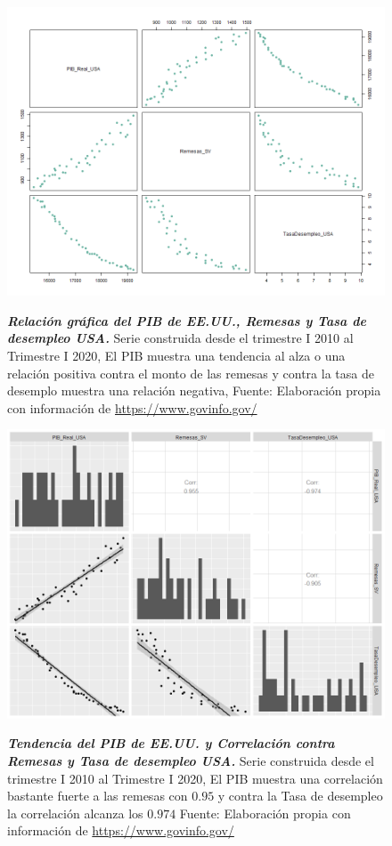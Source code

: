 \begin{figure}[H]
	\centering
	\resizebox{12 cm}{!} { 
		\includegraphics[width=1\linewidth]{Imagenes/Grafo_09}}
	\caption{\textbf{\textit{Relación gráfica del PIB de EE.UU., Remesas y Tasa de desempleo USA.}}
		{\small Serie construida desde el trimestre I 2010 al Trimestre I 2020, El PIB muestra una tendencia al alza o una relación positiva contra el monto de las remesas y contra la tasa de desemplo muestra una relación negativa, Fuente: Elaboración propia con información de \href{https://www.govinfo.gov/}{https://www.govinfo.gov/}}
	} 
	\label{fig:9}
	
\end{figure}


\begin{figure}[H]
	\centering
	\resizebox{12 cm}{!} { 
		\includegraphics[width=1\linewidth]{Imagenes/Grafo_10}}
	\caption{\textbf{\textit{Tendencia del PIB de EE.UU. y Correlación contra Remesas y Tasa de desempleo USA.}}
		{\small Serie construida desde el trimestre I 2010 al Trimestre I 2020, El PIB muestra una correlación bastante fuerte a las remesas con $0.95$ y contra la Tasa de desempleo la correlación alcanza los $0.974$ Fuente: Elaboración propia con información de \href{https://www.govinfo.gov/}{https://www.govinfo.gov/}}
	} 
	\label{fig:10}
	
\end{figure}

